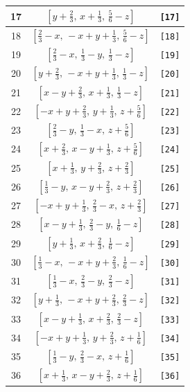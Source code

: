 \documentclass[fleqn,8pt]{jsarticle}
\begin{document}
\begin{longtable}{ccc}
17 & $\left[ y + \frac{2}{3},\, x + \frac{1}{3},\, \frac{5}{6} - z \right]$ & {\tt [17]} \\ \hline
18 & $\left[ \frac{2}{3} - x,\, - x + y + \frac{1}{3},\, \frac{5}{6} - z \right]$ & {\tt [18]} \\ \hline
19 & $\left[ \frac{2}{3} - x,\, \frac{1}{3} - y,\, \frac{1}{3} - z \right]$ & {\tt [19]} \\ \hline
20 & $\left[ y + \frac{2}{3},\, - x + y + \frac{1}{3},\, \frac{1}{3} - z \right]$ & {\tt [20]} \\ \hline
21 & $\left[ x - y + \frac{2}{3},\, x + \frac{1}{3},\, \frac{1}{3} - z \right]$ & {\tt [21]} \\ \hline
22 & $\left[ - x + y + \frac{2}{3},\, y + \frac{1}{3},\, z + \frac{5}{6} \right]$ & {\tt [22]} \\ \hline
23 & $\left[ \frac{2}{3} - y,\, \frac{1}{3} - x,\, z + \frac{5}{6} \right]$ & {\tt [23]} \\ \hline
24 & $\left[ x + \frac{2}{3},\, x - y + \frac{1}{3},\, z + \frac{5}{6} \right]$ & {\tt [24]} \\ \hline
25 & $\left[ x + \frac{1}{3},\, y + \frac{2}{3},\, z + \frac{2}{3} \right]$ & {\tt [25]} \\ \hline
26 & $\left[ \frac{1}{3} - y,\, x - y + \frac{2}{3},\, z + \frac{2}{3} \right]$ & {\tt [26]} \\ \hline
27 & $\left[ - x + y + \frac{1}{3},\, \frac{2}{3} - x,\, z + \frac{2}{3} \right]$ & {\tt [27]} \\ \hline
28 & $\left[ x - y + \frac{1}{3},\, \frac{2}{3} - y,\, \frac{1}{6} - z \right]$ & {\tt [28]} \\ \hline
29 & $\left[ y + \frac{1}{3},\, x + \frac{2}{3},\, \frac{1}{6} - z \right]$ & {\tt [29]} \\ \hline
30 & $\left[ \frac{1}{3} - x,\, - x + y + \frac{2}{3},\, \frac{1}{6} - z \right]$ & {\tt [30]} \\ \hline
31 & $\left[ \frac{1}{3} - x,\, \frac{2}{3} - y,\, \frac{2}{3} - z \right]$ & {\tt [31]} \\ \hline
32 & $\left[ y + \frac{1}{3},\, - x + y + \frac{2}{3},\, \frac{2}{3} - z \right]$ & {\tt [32]} \\ \hline
33 & $\left[ x - y + \frac{1}{3},\, x + \frac{2}{3},\, \frac{2}{3} - z \right]$ & {\tt [33]} \\ \hline
34 & $\left[ - x + y + \frac{1}{3},\, y + \frac{2}{3},\, z + \frac{1}{6} \right]$ & {\tt [34]} \\ \hline
35 & $\left[ \frac{1}{3} - y,\, \frac{2}{3} - x,\, z + \frac{1}{6} \right]$ & {\tt [35]} \\ \hline
36 & $\left[ x + \frac{1}{3},\, x - y + \frac{2}{3},\, z + \frac{1}{6} \right]$ & {\tt [36]} \\
\end{longtable}
\end{document}
